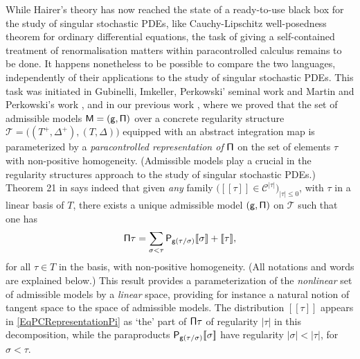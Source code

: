 \documentclass[11pt]{article}
\numberwithin{equation}{section}
\theoremstyle{plain}
\theoremstyle{definition}
\newcommand{\Brac}[1]{[\![#1]\!]}
\newcommand{\scrT}{\mathscr{T}}
\newcommand{\mcC}{\mathcal{C}}
\begin{document}
While Hairer's theory has now reached the state of a ready-to-use black box for the study of singular stochastic PDEs, like Cauchy-Lipschitz well-posedness theorem for ordinary differential equations, the task of giving a self-contained treatment of renormalisation matters within paracontrolled calculus remains to be done. It happens nonetheless to be possible to compare the two languages, independently of their applications to the study of singular stochastic PDEs. This task was initiated in Gubinelli, Imkeller, Perkowski' seminal work \cite{GIP} and Martin and Perkowski's work \cite{MP18}, and in our previous work \cite{BH}, where we proved that the set of admissible models $\sf M=(g,\Pi)$ over a concrete regularity structure $\scrT=\bigl((T^+,\Delta^+), (T,\Delta)\bigr)$ equipped with an abstract integration map is parameterized by a \emph{paracontrolled representation of} $\sf \Pi$ on the set of elements $\tau$ with non-positive homogeneity. (Admissible models play a crucial in the regularity structures approach to the study of singular stochastic PDEs.) Theorem 21 in \cite{BH} says indeed that given \emph{any} family $\bigl(\Brac{\tau}\in\mcC^{\vert\tau\vert}\bigr)_{\vert\tau\vert\leq 0}$, with $\tau$ in a linear basis of $T$, there exists a unique admissible model $\sf (g,\Pi)$ on $\mathscr{T}$ such that one has
\begin{equation} \label{EqPCRepresentationPi}
{\sf \Pi} \tau = \sum_{\sigma<\tau} {\sf P}_{{\sf g}(\tau/\sigma)}\Brac{\sigma} + \Brac{\tau},
\end{equation}
for all $\tau\in T$ in the basis, with non-positive homogeneity. (All notations and words are explained below.) This result provides a parameterization of the \emph{nonlinear} set of admissible models by a \emph{linear} space, providing for instance a natural notion of tangent space to the space of admissible models. The distribution $\Brac{\tau}$ appears in \eqref{EqPCRepresentationPi} as `the' part of ${\sf\Pi}\tau$ of regularity $\vert\tau\vert$ in this decomposition, while the paraproducts ${\sf P}_{{\sf g}(\tau/\sigma)}\Brac{\sigma}$ have regularity $\vert\sigma\vert<\vert\tau\vert$, for $\sigma<\tau$.
\end{document}

